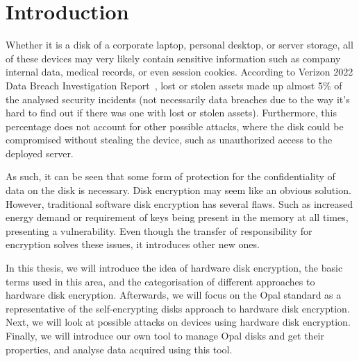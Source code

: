
\chapter{Introduction}


Whether it is a disk of a corporate laptop, personal desktop, or server storage, all of these devices may very likely contain sensitive information such as company internal data, medical records, or even session cookies.
According to Verizon 2022 Data Breach Investigation Report~\cite{verizon_dbir}, lost or stolen assets made up almost 5\% of the analysed security incidents (not necessarily data breaches due to the way it's hard to find out if there was one with lost or stolen assets). Furthermore, this percentage does not account for other possible attacks, where the disk could be compromised without stealing the device, such as unauthorized access to the deployed server.


As such, it can be seen that some form of protection for the confidentiality of data on the disk is necessary. Disk encryption may seem like an obvious solution. However, traditional software disk encryption has several flaws. Such as increased energy demand or requirement of keys being present in the memory at all times, presenting a vulnerability.
Even though the transfer of responsibility for encryption solves these issues, it introduces other new ones.



In this thesis, we will introduce the idea of hardware disk encryption, the basic terms used in this area, and the categorisation of different approaches to hardware disk encryption. Afterwards, we will focus on the Opal standard as a representative of the self-encrypting disks approach to hardware disk encryption. Next, we will look at possible attacks on devices using hardware disk encryption. Finally, we will introduce our own tool to manage Opal disks and get their properties, and analyse data acquired using this tool.

\label{TODO}